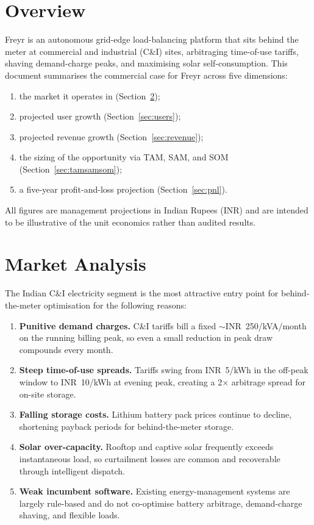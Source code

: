 \documentclass[journal,article,submit,moreauthors]{Definitions/mdpi}
\begin{document}
\tableofcontents
\section{Overview}\label{overview}

Freyr is an autonomous grid-edge load-balancing platform that sits behind the
meter at commercial and industrial (C\&I) sites, arbitraging time-of-use
tariffs, shaving demand-charge peaks, and maximising solar self-consumption.
This document summarises the commercial case for Freyr across five dimensions:

\begin{enumerate}
	\item the market it operates in (Section~\ref{sec:market});
	\item projected user growth (Section~\ref{sec:users});
	\item projected revenue growth (Section~\ref{sec:revenue});
	\item the sizing of the opportunity via TAM, SAM, and SOM
	      (Section~\ref{sec:tamsamsom});
	\item a five-year profit-and-loss projection (Section~\ref{sec:pnl}).
\end{enumerate}

All figures are management projections in Indian Rupees (INR) and are intended
to be illustrative of the unit economics rather than audited results.

\section{Market Analysis}\label{sec:market}

The Indian C\&I electricity segment is the most attractive entry point for
behind-the-meter optimisation for the following reasons:

\begin{enumerate}
	\item \textbf{Punitive demand charges.} C\&I tariffs bill a fixed
	      \mbox{$\sim$INR~250/kVA/month} on the running billing peak, so even a
	      small reduction in peak draw compounds every month.
	\item \textbf{Steep time-of-use spreads.} Tariffs swing from
	      \mbox{INR~5/kWh} in the off-peak window to \mbox{INR~10/kWh} at
	      evening peak, creating a 2$\times$ arbitrage spread for on-site
	      storage.
	\item \textbf{Falling storage costs.} Lithium battery pack prices continue
	      to decline, shortening payback periods for behind-the-meter storage.
	\item \textbf{Solar over-capacity.} Rooftop and captive solar frequently
	      exceeds instantaneous load, so curtailment losses are common and
	      recoverable through intelligent dispatch.
	\item \textbf{Weak incumbent software.} Existing energy-management systems
	      are largely rule-based and do not co-optimise battery arbitrage,
	      demand-charge shaving, and flexible loads.
\end{enumerate}
\end{document}
